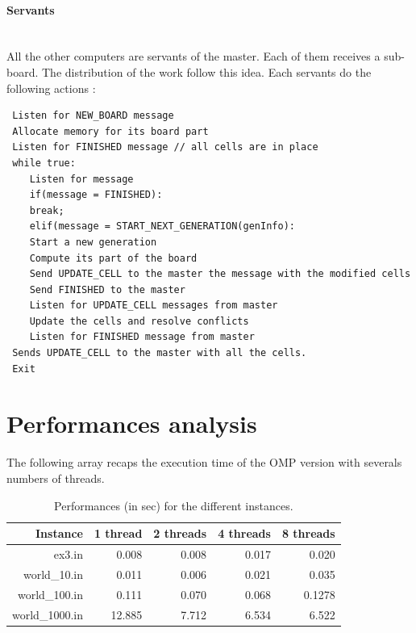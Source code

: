 \documentclass[a4paper,10pt]{article}
\begin{document}
\paragraph{Servants}
~\\

All the other computers are servants of the master. Each of them receives a sub-board. The distribution of the work follow this idea.
Each servants do the following actions :

\begin{lstlisting}
 Listen for NEW_BOARD message
 Allocate memory for its board part
 Listen for FINISHED message // all cells are in place
 while true:
    Listen for message
    if(message = FINISHED):
	break;
    elif(message = START_NEXT_GENERATION(genInfo):
	Start a new generation
    Compute its part of the board
    Send UPDATE_CELL to the master the message with the modified cells
    Send FINISHED to the master
    Listen for UPDATE_CELL messages from master
    Update the cells and resolve conflicts
    Listen for FINISHED message from master
 Sends UPDATE_CELL to the master with all the cells.
 Exit
\end{lstlisting}

\section*{Performances analysis}

The following array recaps the execution time of the OMP version with severals numbers of threads.
\begin{table}[!ht]
\centering
\begin{tabular}{|r||r|r|r|r|}
  \hline
    Instance     & 1 thread   & 2 threads   & 4 threads  & 8 threads  \\
  \hline
    ex3.in       &  0.008     & 0.008        & 0.017       &  0.020 \\ 
  \hline
    world\_10.in &  0.011      &  0.006       & 0.021       & 0.035 \\ 
  \hline
   world\_100.in &  0.111      & 0.070        & 0.068      & 0.1278 \\ 
  \hline
  world\_1000.in &  12.885   & 7.712       & 6.534      &  6.522 \\ 
  \hline
\end{tabular}
\caption{Performances (in sec) for the different instances.}
\end{table}
\end{document}
